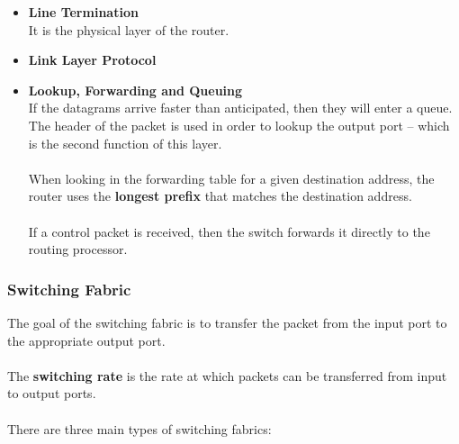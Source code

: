 \documentclass{article}
\begin{document}
\begin{itemize}
	\item \textbf{Line Termination}
	\vspace{.2cm} \\
	It is the physical layer of the router.
	
	\item \textbf{Link Layer Protocol}
	\item \textbf{Lookup, Forwarding and Queuing}
	\vspace{.2cm} \\
	If the datagrams arrive faster than anticipated, then they will enter a queue. The header of the packet is used in order to lookup the output port -- which is the second function of this layer. \\ \\
	When looking in the forwarding table for a given destination address, the router uses the \textbf{longest prefix} that matches the destination address. \\ \\
	If a control packet is received, then the switch forwards it directly to the routing processor.
\end{itemize}

\subsubsection{Switching Fabric}
The goal of the switching fabric is to transfer the packet from the input port to the appropriate output port. \\ \\
The \textbf{switching rate} is the rate at which packets can be transferred from input to output ports. \\ \\
There are three main types of switching fabrics:
\end{document}
